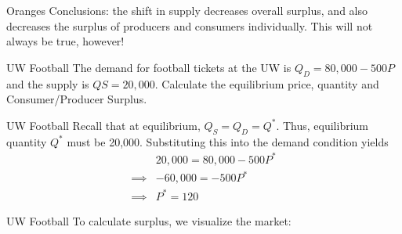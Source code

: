 \documentclass{beamer}
\begin{document}
\begin{frame}{Oranges}
    Conclusions: the shift in supply decreases overall surplus, and also decreases the surplus of producers and consumers individually. This will not always be true, however!
\end{frame}

\begin{frame}{UW Football}
    The demand for football tickets at the UW is $Q_D=80,000 - 500P$ and the supply is $QS=20,000$. Calculate the equilibrium price, quantity and Consumer/Producer Surplus.
\end{frame}

\begin{frame}{UW Football}
    Recall that at equilibrium, $Q_S=Q_D=Q^*$. Thus, equilibrium quantity $Q^*$ must be 20,000. Substituting this into the demand condition yields
    \[\begin{split}
        &20,000 = 80,000 - 500P^* \\
        \implies &-60,000 = -500P^* \\
        \implies &\boxed{P^* = 120}
    \end{split}\]
\end{frame}

\begin{frame}[t]{UW Football}
    To calculate surplus, we visualize the market:
    \begin{center}
    \end{center}
    
\end{frame}
\end{document}
